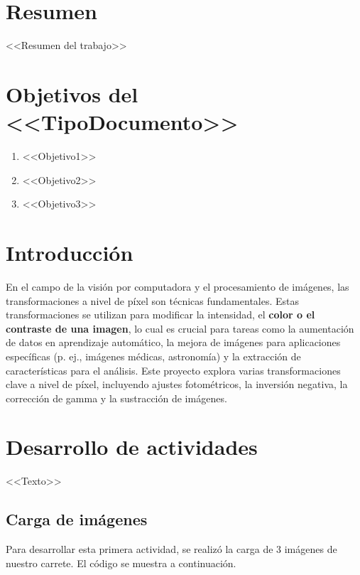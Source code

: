 \documentclass[12pt,letterpaper]{article}
\begin{document}
\setcounter{page}{1} %

\section*{Resumen}

<<Resumen del trabajo>>
\section*{Objetivos del <<TipoDocumento>>}

\begin{enumerate}
  \item <<Objetivo1>>
  \item <<Objetivo2>>
  \item <<Objetivo3>>
\end{enumerate}

\newpage

\tableofcontents
\newpage

\listoffigures
\newpage

\section{Introducción}

En el campo de la visión por computadora y el procesamiento de imágenes, las transformaciones a nivel de píxel son técnicas fundamentales. Estas transformaciones se utilizan para modificar la intensidad, el \textbf{color o el contraste de una imagen}, lo cual es crucial para tareas como la aumentación de datos en aprendizaje automático, la mejora de imágenes para aplicaciones específicas (p. ej., imágenes médicas, astronomía) y la extracción de características para el análisis. Este proyecto explora varias transformaciones clave a nivel de píxel, incluyendo ajustes fotométricos, la inversión negativa, la corrección de gamma y la sustracción de imágenes.


\newpage

\section{Desarrollo de actividades}

<<Texto>>

\subsection{Carga de imágenes}
Para desarrollar esta primera actividad, se realizó la carga de 3 imágenes de nuestro carrete. El código se muestra a continuación. 
\end{document}
